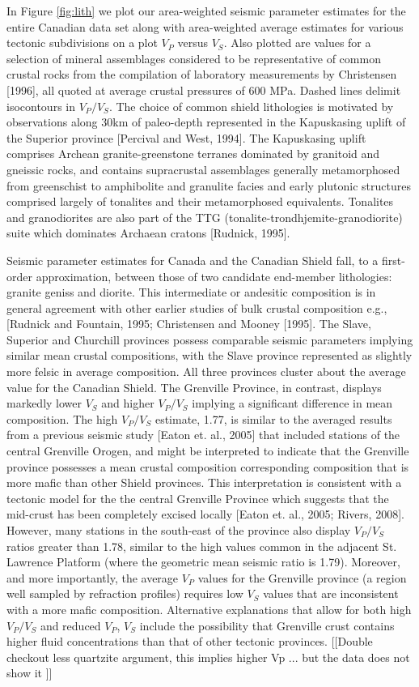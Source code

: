 \documentclass[draft, 12pt]{article}
\begin{document}
In Figure \ref{fig:lith} we plot our area-weighted seismic parameter estimates for the entire Canadian data set along with area-weighted average estimates for various tectonic subdivisions on a plot $V_P$ versus $V_S$. Also plotted are values for a selection of mineral assemblages considered to be representative of common crustal rocks from the compilation of laboratory measurements by Christensen [1996], all quoted at average crustal pressures of 600 MPa. Dashed lines delimit isocontours in $V_P/V_S$. The choice of common shield lithologies is motivated by observations along 30km of paleo-depth represented in the Kapuskasing uplift of the Superior province [Percival and West, 1994]. The Kapuskasing uplift comprises Archean granite-greenstone terranes dominated by granitoid and gneissic rocks, and contains supracrustal assemblages generally metamorphosed from greenschist to amphibolite and granulite facies and early plutonic structures comprised largely of tonalites and their metamorphosed equivalents. Tonalites and granodiorites are also part of the TTG (tonalite-trondhjemite-granodiorite) suite which dominates Archaean cratons [Rudnick, 1995].

Seismic parameter estimates for Canada and the Canadian Shield fall, to a first-order approximation, between those of two candidate end-member lithologies: granite geniss and diorite. This intermediate or andesitic composition is in general agreement with other earlier studies of bulk crustal composition e.g., [Rudnick and Fountain, 1995; Christensen and Mooney [1995]. The Slave, Superior and Churchill provinces possess comparable seismic parameters implying similar mean crustal compositions, with the Slave province represented as slightly more felsic in average composition. All three provinces cluster about the average value for the Canadian Shield. The Grenville Province, in contrast, displays markedly lower $V_S$ and higher $V_P/V_S$ implying a significant difference in mean composition. The high $V_P/V_S$ estimate, 1.77, is similar to the averaged results from a previous seismic study [Eaton et. al., 2005] that included stations of the central Grenville Orogen, and might be interpreted to indicate that the Grenville province possesses a mean crustal composition corresponding composition that is more mafic than other Shield provinces. This interpretation is consistent with a tectonic model for the the central Grenville Province which suggests that the mid-crust has been completely excised locally [Eaton et. al., 2005; Rivers, 2008]. However, many stations in the south-east of the province also display $V_P/V_S$ ratios greater than 1.78, similar to the high values common in the adjacent St. Lawrence Platform (where the geometric mean seismic ratio is 1.79). Moreover, and more importantly, the average $V_P$ values for the Grenville province (a region well sampled by refraction profiles) requires low $V_S$ values that are inconsistent with a more mafic composition. Alternative explanations that allow for both high $V_P/V_S$ and reduced $V_P$, $V_S$ include the possibility that Grenville crust contains higher fluid concentrations than that of other tectonic provinces. [[Double checkout less quartzite argument, this implies higher Vp ... but the data does not show it ]]
\end{document}
